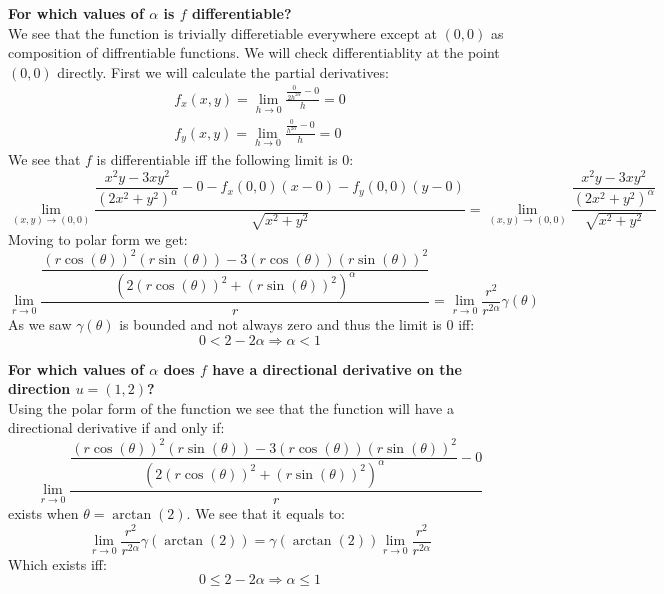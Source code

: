 \documentclass[11pt,a4paper]{article}
\begin{document}
	\newpage
	
	\textbf{For which values of $\alpha$ is $f$ differentiable?} \\
	We see that the function is trivially differetiable everywhere
	except at $(0,0)$ as composition of diffrentiable functions.
	We will check differentiablity at the point $(0,0)$ directly.
	First we will calculate the partial derivatives:
	\begin{align*}
		f_x(x,y) = \lim_{h\to 0}
		{\frac{\frac{0}{2h^{2\alpha}} - 0}{h}} = 0 \\
		f_y(x,y) = \lim_{h\to 0}
		{\frac{\frac{0}{h^{2\alpha}} - 0}{h}} = 0
	\end{align*}
	We see that $f$ is differentiable iff the following limit is $0$:
	\[
		\lim_{(x,y)\to(0,0)}{\frac{\dfrac{x^2y-3xy^2}{(2x^2+y^2)^\alpha} - 0 - f_x(0,0)(x-0) - f_y(0,0)(y-0)}{\sqrt{x^2+y^2}}} = 
		\lim_{(x,y)\to(0,0)}{\frac{\dfrac{x^2y-3xy^2}{(2x^2+y^2)^\alpha}}{\sqrt{x^2+y^2}}}
	\]
	Moving to polar form we get: 
	\[
	\lim_{r\to 0}{\frac{\dfrac{(r\cos(\theta))^2(r\sin(\theta))-3(r\cos(\theta))(r\sin(\theta))^2}{(2(r\cos(\theta))^2+(r\sin(\theta))^2)^\alpha}}{r}} = \lim_{r\to 0}{\frac{r^2}{r^{2\alpha}}\gamma(\theta)}
	\]
	As we saw $\gamma(\theta)$ is bounded and not always zero and thus the limit
	is $0$ iff:
	\[
		0 < {2-2\alpha} \Rightarrow \boxed{\alpha < 1}
	\]
	
	\newpage
	
	\textbf{For which values of $\alpha$ does $f$ have a directional 
	derivative on the direction $u=(1,2)$?} \\
	Using the polar form of the function we see that the function
	will have a directional derivative if and only if:
	\[
		\lim_{r\to 0}{\frac{\dfrac{(r\cos(\theta))^2(r\sin(\theta))-3(r\cos(\theta))(r\sin(\theta))^2}{(2(r\cos(\theta))^2+(r\sin(\theta))^2)^\alpha} - 0}{r}}
	\]
	exists when $\theta = \arctan(2)$. We see that it equals to:
	\[
		\lim_{r\to 0}{\frac{r^2}{r^{2\alpha}}\gamma(\arctan(2))} = 
		\gamma(\arctan(2))\lim_{r\to 0}{\frac{r^2}{r^{2\alpha}}}
	\]
	Which exists iff:
	\[
		0 \le {2-2\alpha} \Rightarrow \boxed{\alpha \le 1}
	\]
	
	\newpage
	
\end{document}
